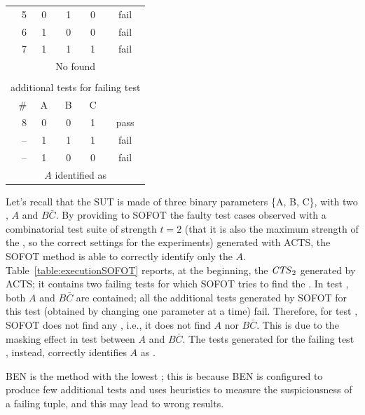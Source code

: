 \begin{tikzborder}{\cite{Gargantini16:validation}}
\begin{tikzborder}{\cite{gargantini_combinatorial_2017}}
\begin{tikzborder}{\cite{gargantini_combinatorial_2017}}
\begin{tikzborder}{\cite{garn2019}}
\begin{tikzborder}{\cite{arcaini2019achieving}}
\begin{tikzborder}{}
\begin{table}[!htb]
\begin{tabular}{r|c|c|c||c}
		\hline
		5& 0 & 1 & 0 & \textsf{fail} \\
		6& 1 & 0 & 0 & \textsf{fail} \\
		7& 1 & 1 & 1 & \textsf{fail} \\
		\multicolumn{5}{c}{No \mfic found}\\ 
		\hline
		\multicolumn{5}{c}{} \\
		\hline
		\multicolumn{5}{c}{additional tests for failing test \ding{173}}\\
		\midrule
		\# & A & B & C & \result \\
		\hline
		8& 0 & 0 & 1 & \textsf{pass} \\
		--& 1 & 1 & 1 & \textsf{fail} \\
		--& 1 & 0 & 0 & \textsf{fail} \\
		\multicolumn{5}{c}{$A$ identified as \mfic}\\ 
		\bottomrule
	\end{tabular}
\end{table}
%
Let's recall that the SUT is made of three binary parameters \{A, B, C\}, with two \truemfics, $A$ and $B\bar{C}$. By providing to SOFOT the faulty test cases observed with a combinatorial test suite of strength $t=2$ (that it is also the maximum strength of the \truemfics, so the correct settings for the experiments) generated with ACTS, the SOFOT method is able to correctly identify only the \mfic $A$. Table~\ref{table:executionSOFOT} reports, at the beginning, the $\mathit{CTS}_2$ generated by ACTS; it contains two failing tests for which SOFOT tries to find the \mfic.
In test , both \truemfics $A$ and $B\bar{C}$ are contained; all the additional tests generated by SOFOT for this test (obtained by changing one parameter at a time) fail. Therefore, for test , SOFOT does not find any \mfic, i.e., it does not find $A$ nor $B\bar{C}$. This is due to the masking effect in test  between $A$ and $B\bar{C}$. The tests generated for the failing test , instead, correctly identifies $A$ as \mfic.

BEN is the method with the lowest \fScore; this is because BEN is configured to produce few additional tests and uses heuristics to measure the suspiciousness of a failing tuple, and this may lead to wrong results.



\end{tikzborder}
\end{tikzborder}
\end{tikzborder}
\end{tikzborder}
\end{tikzborder}
\end{tikzborder}
